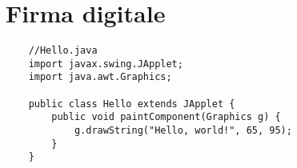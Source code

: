 \chapter{Firma digitale}

\begin{lstlisting}
	//Hello.java
	import javax.swing.JApplet;
	import java.awt.Graphics;
	
	public class Hello extends JApplet {
		public void paintComponent(Graphics g) {
			g.drawString("Hello, world!", 65, 95);
		}    
	}
\end{lstlisting}